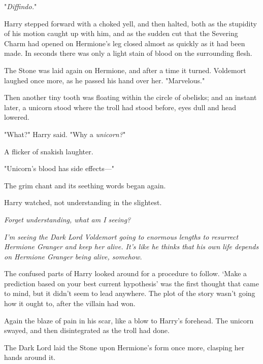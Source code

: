 "\emph{Diffindo.}"

Harry stepped forward with a choked yell, and then halted, both as the
stupidity of his motion caught up with him, and as the sudden cut that the
Severing Charm had opened on Hermione's leg closed almost as quickly as it had
been made. In seconds there was only a light stain of blood on the surrounding
flesh.

The Stone was laid again on Hermione, and after a time it turned. Voldemort
laughed once more, as he passed his hand over her. "Marvelous."

Then another tiny tooth was floating within the circle of obelisks; and an
instant later, a unicorn stood where the troll had stood before, eyes dull and
head lowered.

"What?" Harry said. "Why a \emph{unicorn?}"

 A flicker of snakish laughter. 

"Unicorn's blood has side effects\mbox{---}"


The grim chant and its seething words began again.

Harry watched, not understanding in the slightest.

\emph{Forget understanding, what am I seeing?}

\emph{I'm seeing the Dark Lord Voldemort going to enormous lengths to resurrect
Hermione Granger and keep her alive. It's like he thinks that his own life
depends on Hermione Granger being alive, somehow.}

The confused parts of Harry looked around for a procedure to follow. `Make a
prediction based on your best current hypothesis' was the first thought that
came to mind, but it didn't seem to lead anywhere. The plot of the story wasn't
going how it ought to, after the villain had won.

Again the blaze of pain in his scar, like a blow to Harry's forehead. The
unicorn swayed, and then disintegrated as the troll had done.

The Dark Lord laid the Stone upon Hermione's form once more, clasping her hands
around it.

